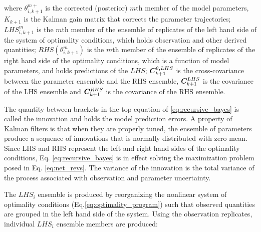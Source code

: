 \noindent where $\theta_{i,k+1}^{m+}$ is the corrected (posterior) $m$th member of the model parameters, $K_{k+1}$ is the Kalman gain matrix that corrects the parameter trajectories; ${LHS}^m_{i,k+1}$ is the $m$th member of the ensemble of replicates of the left hand side of the system of optimality conditions, which holds observation and other derived quantities; $RHS(\theta_{i,k+1}^{m})$ is the $m$th member of the ensemble of replicates of the right hand side of the optimality conditions, which is a function of model parameters, and holds predictions of the $LHS$;   $\bm{C}^{\theta,LHS}_{k+1}$  is the cross-covariance between the parameter ensemble and the RHS ensemble, $\bm{C}^{LHS}_{k+1}$ is the covariance of the LHS ensemble and $\bm{C}^{RHS}_{k+1}$ is the covariance of the RHS ensemble. 

The quantity between brackets in the top equation of \eqref{eq:recursive_bayes} is called the innovation and holds the model prediction errors. A property of Kalman filters is that when they are properly tuned, the ensemble of parameters produce a sequence of innovations that is normally distributed with zero mean. Since LHS and RHS represent the left and right hand sides of the optimality conditions, Eq. \ref{eq:recursive_bayes} is in effect solving the maximization problem posed in Eq. \ref{eq:net_revs}. The variance of the innovation is the total variance of the process associated with observation and parameter uncertainty. 






The $LHS_i$ ensemble is produced by reorganizing the nonlinear system of optimality conditions (Eq.\eqref{eq:optimality_program}) such that observed quantities are grouped in the left hand side of the system. Using the observation replicates, individual $LHS_i$ ensemble members are produced:

